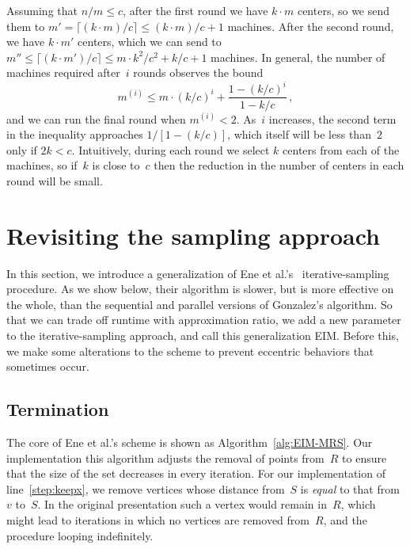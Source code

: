 \documentclass[11pt]{article}
\newcommand{\ene}{{\sc EIM}\xspace}
\begin{document}
Assuming that $n/m\leq c$, after the first round we have $k\cdot m$ centers, so we send them to $m' = \lceil(k\cdot m)/c\rceil \leq  (k\cdot m)/c + 1$ machines.
After the second round, we have $k\cdot m'$ centers, which we can send to $m'' \leq  \lceil(k\cdot m')/c\rceil \leq m\cdot k^2/c^2 + k/c +1$ machines.  
In general,
the number of machines required after~$i$ rounds observes the bound
\begin{equation}\label{eq:inequality}
m^{(i)} \leq m\cdot (k/c)^i + \frac{1-(k/c)^i}{1-k/c}\,,
\end{equation}
and we can run the final round when $m^{(i)}<2$.
As~$i$ increases, the second term in the inequality approaches ${1}/[1-(k/c)]$, which
itself will be less than~$2$ only if $2k<c$.
Intuitively, during each round we select $k$ centers from each of the machines, so if~$k$ is close to~$c$ then the reduction in the number of centers in each round will be small.



\section{Revisiting the sampling approach}

In this section, we introduce a generalization of
Ene et al.'s~\cite{ene2011fast} iterative-sampling procedure.
As we show below, their algorithm is slower, but is more effective on the whole, than the sequential and parallel versions of Gonzalez's algorithm.
So that we can trade off runtime with approximation ratio,
we add a new parameter to the iterative-sampling approach, and call this
generalization \ene.
Before this, we make some alterations to the scheme to prevent eccentric behaviors that sometimes occur.



\subsection{Termination}
The core of Ene et al.'s scheme is shown as Algorithm~\ref{alg:EIM-MRS}.
Our implementation this algorithm adjusts the removal of points from~$R$
to ensure that the size of the set decreases in every iteration.
For our implementation of line~\ref{step:keepx},
we remove vertices whose distance from~$S$ is \emph{equal} to that
from~$v$ to~$S$. 
In the original presentation such a vertex would remain in~$R$,
which might lead to iterations in which
no vertices are removed from~$R$, and the procedure looping indefinitely. 
\end{document}
